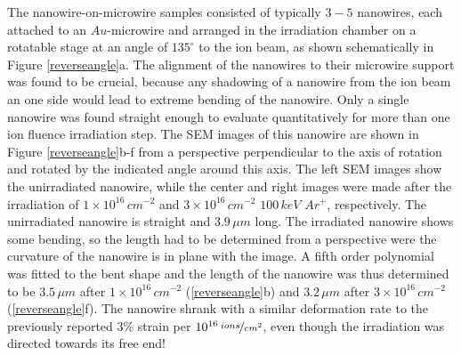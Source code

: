 The nanowire-on-microwire samples consisted of typically $3-5$ nanowires, each attached to an $Au$-microwire and arranged in the irradiation chamber on a rotatable stage at an angle of $135^\circ$ to the ion beam, as shown schematically in Figure \ref{reverseangle}a. The alignment of the nanowires to their microwire support was found to be crucial, because any shadowing of a nanowire from the ion beam an one side would lead to extreme bending of the nanowire. Only a single nanowire was found straight enough to evaluate quantitatively for more than one ion fluence irradiation step. The SEM images of this nanowire are shown in Figure \ref{reverseangle}b-f from a perspective perpendicular to the axis of rotation and rotated by the indicated angle around this axis. The left SEM images show the unirradiated nanowire, while the center and right images were made after the irradiation of $1\times10^{16}\,cm^{-2}$ and $3\times10^{16}\,cm^{-2}$ $100\,keV\,\,Ar^+$, respectively. The unirradiated nanowire is straight and $3.9\,\mu m$ long. The irradiated nanowire shows some bending, so the length had to be determined from a perspective were the curvature of the nanowire is in plane with the image. A fifth order polynomial was fitted to the bent shape and the length of the nanowire was thus determined to be $3.5\,\mu m$ after $1\times10^{16}\,cm^{-2}$ (\ref{reverseangle}b) and $3.2\,\mu m$ after $3\times10^{16}\,cm^{-2}$ (\ref{reverseangle}f). The nanowire shrank with a similar deformation rate to the previously reported $3\%$ strain per $10^{16}\,\nicefrac{ions}{cm^2}$, even though the irradiation was directed towards its free end!

